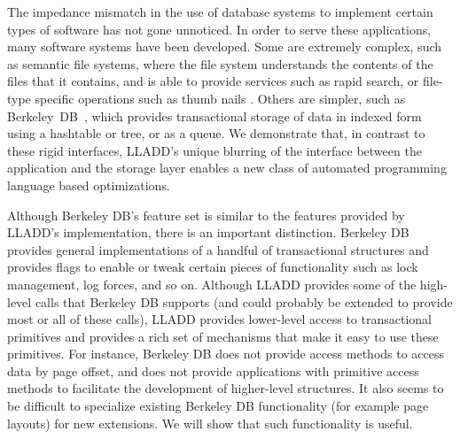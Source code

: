 \documentclass[10pt,letterpaper,twocolumn,english]{article}
\newcommand{\yad}{LLADD\xspace}
\begin{document}
The impedance mismatch in the use of database systems to implement
certain types of software has not gone unnoticed.
%
%
%
In
order to serve these applications, many software systems have been 
developed.  Some are extremely complex, such as semantic file
systems, where the file system understands the contents of the files
that it contains, and is able to provide services such as rapid
search, or file-type specific operations such as thumb nails \cite{reiser,semantic}.  Others are simpler, such as
Berkeley~DB~\cite{berkeleyDB}, which provides transactional
storage of data in indexed form using a hashtable or tree, or as a queue.  
We demonstrate that, in contrast to these rigid interfaces, \yad's unique 
blurring of the interface between the application and the storage layer 
enables a new class of automated programming language based optimizations.

Although Berkeley DB's feature set is similar to the features provided by
\yad's implementation, there is an important distinction.  Berkeley DB
provides general implementations of a handful of transactional
structures and provides flags to enable or tweak certain pieces of
functionality such as lock management, log forces, and so on. Although
\yad provides some of the high-level calls that Berkeley DB supports
(and could probably be extended to provide most or all of these calls), \yad
provides lower-level access to transactional primitives and provides a rich 
set of mechanisms that make it easy to use these primitives.  For
instance, Berkeley DB does not provide access methods to access data by 
page offset, and does not provide applications with primitive 
access methods to facilitate the development of higher-level structures.
It also seems to be difficult to specialize existing Berkeley DB functionality 
(for example page layouts) for new extensions.  We will show that such functionality is useful.
\end{document}

